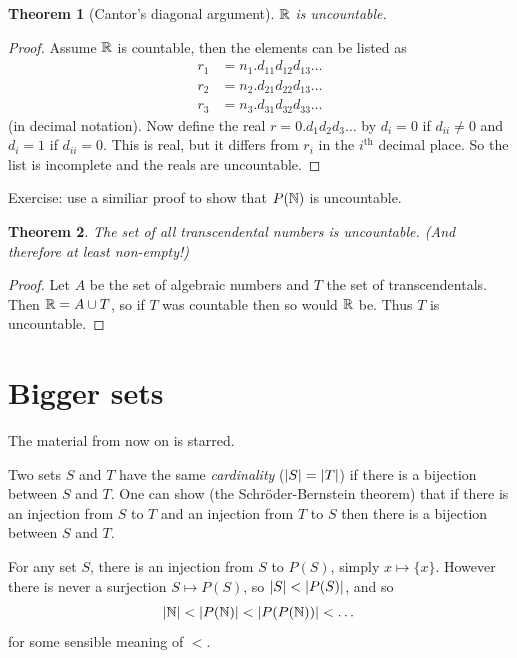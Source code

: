 \documentclass{notes}
\theoremstyle{plain}
\newtheorem{theorem}{Theorem}[chapter]
\begin{document}
\begin{theorem}[Cantor's diagonal argument]
$\mathbb{R}$ is uncountable.
\end{theorem}

\begin{proof}
Assume $\mathbb{R}$ is countable, then the elements can be listed as
\begin{align*}
r_1 &= n_1 . d_{11} d_{12} d_{13} \dots \\
r_2 &= n_2 . d_{21} d_{22} d_{13} \dots \\
r_3 &= n_3 . d_{31} d_{32} d_{33} \dots
\end{align*}
(in decimal notation).  Now define the real
$r = 0.d_1 d_2 d_3 \dots$ by $d_i = 0$ if $d_{ii} \neq 0$ and $d_i
= 1$ if $d_{ii} = 0$.  This is real, but it differs from $r_i$ in the
$i^{\text{th}}$ decimal place.  So the list is incomplete and the
reals are uncountable.
\end{proof}

Exercise: use a similiar proof to show that $P(\mathbb{N})$ is uncountable.

\begin{theorem}
The set of all transcendental numbers is uncountable.  (And therefore
at least non-empty!)
\end{theorem}

\begin{proof}
Let $A$ be the set of algebraic numbers and $T$ the set of transcendentals.
Then $\mathbb{R} = A \cup T$, so if $T$ was countable then so would $\mathbb{R}$ be.  Thus
$T$ is uncountable.
\end{proof}

\section{Bigger sets}

The material from now on is starred.

Two sets $S$ and $T$ have the same \emph{cardinality}  ($\left|S\right|
= \left|T\right|$) if there is a bijection between $S$ and $T$. One can show
(the Schr\"oder-Bernstein theorem) that if there is an injection from
$S$ to $T$ and an injection from $T$ to $S$ then there is a bijection
between $S$ and $T$.

For any set $S$, there is an injection from $S$ to $P(S)$, simply
$x \mapsto \{ x \}$.  However there is never a surjection $S
\mapsto P(S)$, so $\left|S\right| < \left|P(S)\right|$, and so
\[
\left|\mathbb{N}\right| < \left|P(\mathbb{N})\right| < \left|P(P(\mathbb{N}))\right| < \dots
\]
for some sensible meaning of $<$.
\end{document}
